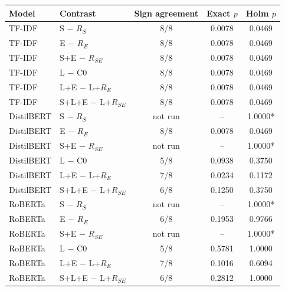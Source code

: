 \begin{tabular}{@{}llccc@{}}
\toprule
Model & Contrast & Sign agreement & Exact $p$ & Holm $p$\\
\midrule
TF-IDF & S $-$ $R_S$ & 8/8 & 0.0078 & 0.0469\\
TF-IDF & E $-$ $R_E$ & 8/8 & 0.0078 & 0.0469\\
TF-IDF & S+E $-$ $R_{SE}$ & 8/8 & 0.0078 & 0.0469\\
TF-IDF & L $-$ C0 & 8/8 & 0.0078 & 0.0469\\
TF-IDF & L+E $-$ L+$R_E$ & 8/8 & 0.0078 & 0.0469\\
TF-IDF & S+L+E $-$ L+$R_{SE}$ & 8/8 & 0.0078 & 0.0469\\
DistilBERT & S $-$ $R_S$ & not run & -- & 1.0000*\\
DistilBERT & E $-$ $R_E$ & 8/8 & 0.0078 & 0.0469\\
DistilBERT & S+E $-$ $R_{SE}$ & not run & -- & 1.0000*\\
DistilBERT & L $-$ C0 & 5/8 & 0.0938 & 0.3750\\
DistilBERT & L+E $-$ L+$R_E$ & 7/8 & 0.0234 & 0.1172\\
DistilBERT & S+L+E $-$ L+$R_{SE}$ & 6/8 & 0.1250 & 0.3750\\
RoBERTa & S $-$ $R_S$ & not run & -- & 1.0000*\\
RoBERTa & E $-$ $R_E$ & 6/8 & 0.1953 & 0.9766\\
RoBERTa & S+E $-$ $R_{SE}$ & not run & -- & 1.0000*\\
RoBERTa & L $-$ C0 & 5/8 & 0.5781 & 1.0000\\
RoBERTa & L+E $-$ L+$R_E$ & 7/8 & 0.1016 & 0.6094\\
RoBERTa & S+L+E $-$ L+$R_{SE}$ & 6/8 & 0.2812 & 1.0000\\
\bottomrule
\end{tabular}
